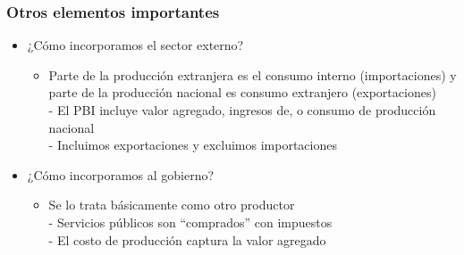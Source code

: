 \documentclass{beamer}
\begin{document}
\begin{frame}
\frametitle{ Otros elementos importantes}
\begin{itemize}
        \item ¿Cómo incorporamos el sector externo?
        \begin{itemize}
            \item Parte de la producción extranjera es el consumo interno (importaciones) y parte de la producción nacional es consumo extranjero (exportaciones) \\ 
            - El PBI incluye valor agregado, ingresos de, o consumo de producción nacional \\
            - Incluimos exportaciones y excluimos importaciones
            \end{itemize} \vspace{1mm}
        \item ¿Cómo incorporamos al gobierno?
        \begin{itemize}
            \item Se lo trata básicamente como otro productor \\
            - Servicios públicos son “comprados” con impuestos \\
            - El costo de producción captura la valor agregado
            \end{itemize}
\end{itemize}
\end{frame}
\end{document}
